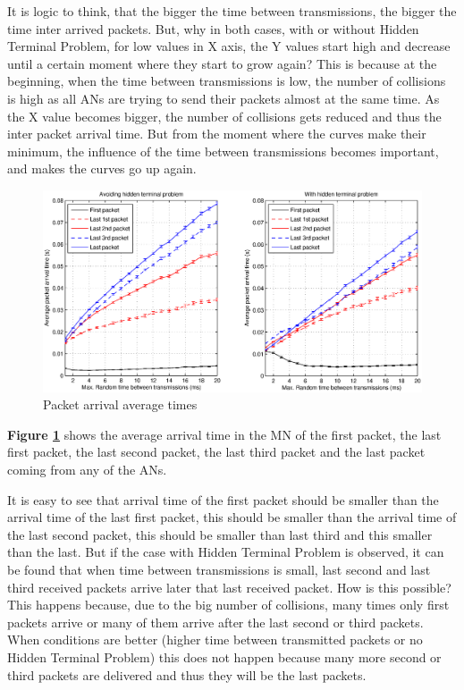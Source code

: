 It is logic to think, that the bigger the time between transmissions, the bigger the time inter arrived packets. But, why in both cases, with or 
without Hidden Terminal Problem, for low values in X axis, the Y values start high and decrease until a certain moment where they start to grow again? 
This is because at the beginning, when the time between transmissions is low, the number of collisions is high as all \acp{AN} are trying to send their
packets almost at the same time. As the X value becomes bigger, the number of collisions gets reduced and thus the inter packet arrival time. But from 
the moment where the curves make their minimum, the influence of the time between transmissions becomes important, and makes the curves go up again.

\begin{figure}[ht]
 \begin{center}
  \includegraphics[width=1\textwidth]{averageDifferentTimes.eps}
 \end{center}
 \caption{Packet arrival average times}
 \label{fig:averageDifferentTimes}
\end{figure}

\textbf{Figure \ref{fig:averageDifferentTimes}} shows the average arrival time in the \ac{MN} of the first packet, the last first packet, the last
second packet, the last third packet and the last packet coming from any of the \acp{AN}.

It is easy to see that arrival time of the first packet should be smaller than the arrival time of the last first packet, this should be smaller than
 the arrival time of the last second packet, this should be smaller than last third and this smaller than the last. But if the case with Hidden 
Terminal Problem is observed, it can be found that when time between transmissions is small, last second and last third received packets arrive later 
that last received packet. How is this possible? This happens because, due to the big number of collisions, many times only first packets arrive or many of 
them arrive after the last second or third packets. When conditions are better (higher time between transmitted packets or no Hidden Terminal Problem) 
this does not happen because many more second or third packets are delivered and thus they will be the last packets.

